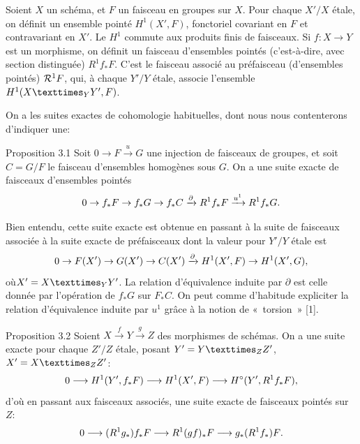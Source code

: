 \documentclass[10pt]{../fichiers-configuration-latex/smfart}
\begin{document}
Soient $X$ un schéma, et $F$ un faisceau en groupes sur $X$. Pour
chaque $X'/X$ étale, on définit un ensemble pointé $H^1(X',F)$,
fonctoriel covariant en $F$ et contravariant en $X'$. Le $H^1$ commute
aux produits finis de faisceaux. Si $f:X\rightarrow Y$ est un
morphisme, on définit un faisceau d'ensembles pointés (c'est-à-dire,
avec section distinguée) $R^1f_{\ast}F$. C'est le faisceau associé au
préfaisceau (d'ensembles pointés) ${\mathcal R}^1F$, qui, à chaque
$Y'/Y$ étale, associe l'ensemble $H^1(\fprod{X}{Y'}{Y},F)$.

On a les suites exactes de cohomologie habituelles, dont nous nous
contenterons d'indiquer une:

\begin{enonce*}{Proposition 3.1}
Soit $0\rightarrow F\xrightarrow{u} G$ une injection de faisceaux de
groupes, et soit $C=G/F$ le faisceau d'ensembles homogènes sous
$G$. On a une suite exacte de faisceaux d'ensembles pointés
$$
0\rightarrow f_{\ast}F\rightarrow f_{\ast}G\rightarrow
f_{\ast}C\xrightarrow{\partial} R^1f_{\ast}F\xrightarrow{u^1}
R^1f_{\ast}G{}.
$$
\end{enonce*}

Bien entendu, cette suite exacte est obtenue en passant à la suite de
faisceaux associée à la suite exacte de préfaisceaux dont la valeur
pour $Y'/Y$ étale est
$$
0\rightarrow F(X')\rightarrow G(X')\rightarrow C(X')
\xrightarrow{\partial} H^1(X',F)\rightarrow H^1(X',G){},
$$
où\pageoriginale $X'=\fprod{X}{Y'}{Y}$. La relation d'équivalence
induite par $\partial$ est celle donnée par l'opération de $f_{\ast}G$
sur $F_{\ast}C$. On peut comme d'habitude expliciter la relation
d'équivalence induite par $u^1$ grâce à la notion de « torsion » 
[1].

\begin{enonce*}{Proposition 3.2}
Soient $X\xrightarrow{f}Y\xrightarrow{g}Z$ des morphismes de
schémas. On a une suite exacte pour chaque $Z'/Z$ étale, posant
$Y'=\fprod{Y}{Z'}{Z}$, $X'=\fprod{X}{Z'}{Z}$:
$$
0\longrightarrow H^1(Y',f_{\ast}F)\longrightarrow
H^1(X',F)\longrightarrow H^{\circ}(Y',R^1f_{\ast}F){},
$$
d'où en passant aux faisceaux associés, une suite exacte de faisceaux
pointés sur $Z$:
$$
0\longrightarrow (R^1g_{\ast})f_{\ast}F\longrightarrow
R^1(gf)_{\ast}F\longrightarrow g_{\ast}(R^1f_{\ast})F{}.
$$
\end{enonce*}
\end{document}
